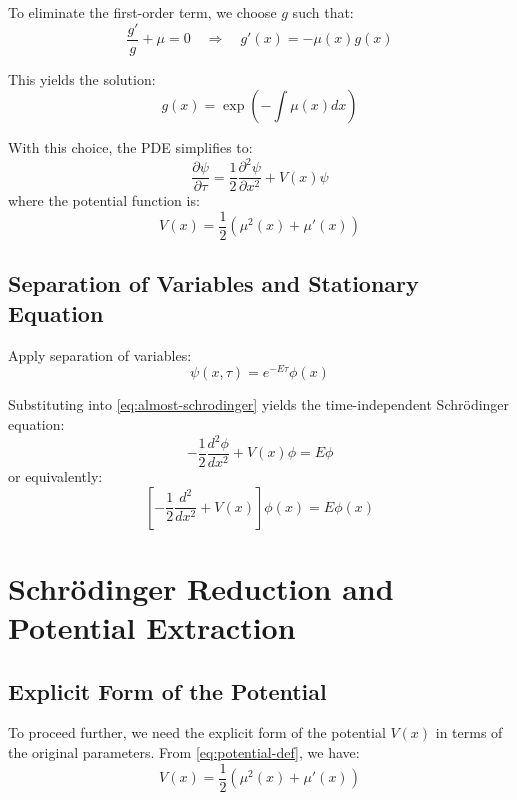 \documentclass[a4paper,11pt]{article}
\begin{document}
To eliminate the first-order term, we choose $g$ such that:
\begin{equation}
\frac{g'}{g} + \mu = 0 \quad \Rightarrow \quad g'(x) = -\mu(x)g(x)
\label{eq:gauge-condition}
\end{equation}

This yields the solution:
\begin{equation}
g(x) = \exp\left(-\int \mu(x)dx\right)
\end{equation}

With this choice, the PDE simplifies to:
\begin{equation}
\frac{\partial \psi}{\partial \tau} = \frac{1}{2}\frac{\partial^2 \psi}{\partial x^2} + V(x)\psi
\label{eq:almost-schrodinger}
\end{equation}
where the potential function is:
\begin{equation}
V(x) = \frac{1}{2}\left(\mu^2(x) + \mu'(x)\right)
\label{eq:potential-def}
\end{equation}

\subsection{Separation of Variables and Stationary Equation}

Apply separation of variables:
\begin{equation}
\psi(x, \tau) = e^{-E\tau}\phi(x)
\label{eq:separation}
\end{equation}

Substituting into \eqref{eq:almost-schrodinger} yields the time-independent Schrödinger equation:
\begin{equation}
-\frac{1}{2}\frac{d^2\phi}{dx^2} + V(x)\phi = E\phi
\label{eq:schrodinger}
\end{equation}
or equivalently:
\begin{equation}
\left[-\frac{1}{2}\frac{d^2}{dx^2} + V(x)\right]\phi(x) = E\phi(x)
\end{equation}

\section{Schrödinger Reduction and Potential Extraction}

\subsection{Explicit Form of the Potential}

To proceed further, we need the explicit form of the potential $V(x)$ in terms of the original parameters. From \eqref{eq:potential-def}, we have:
\begin{equation}
V(x) = \frac{1}{2}\left(\mu^2(x) + \mu'(x)\right)
\end{equation}
\end{document}
